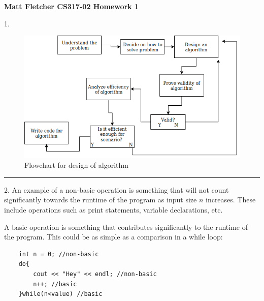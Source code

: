 \documentclass{article}
\begin{document}
	

\thispagestyle{empty}

\let\oldemptyset\emptyset
\let\emptyset\varnothing


\newcommand*{\Perm}[2]{{}^{#1}\!P_{#2}}
\newcommand*{\Comb}[2]{{}_{#1}C_{#2}}


	
\textbf{	Matt Fletcher CS317-02 Homework 1}
\smallskip

1. 

\begin{figure}[H]

  \includegraphics[scale=0.78]{P2Flowchart}
  \caption{Flowchart for design of algorithm}
\end{figure}


\noindent\rule{8cm}{0.4pt}

2. An example of a non-basic operation is something that will not count significantly towards the runtime of the program as input size $n$ increases. These include operations such as print statements, variable declarations, etc. 

A basic operation is something that contributes significantly to the runtime of the program. This could be as simple as a comparison in a while loop:

\begin{lstlisting}
	int n = 0; //non-basic
	do{
		cout << "Hey" << endl; //non-basic
		n++; //basic
	}while(n<value) //basic
\end{lstlisting}
\end{document}
